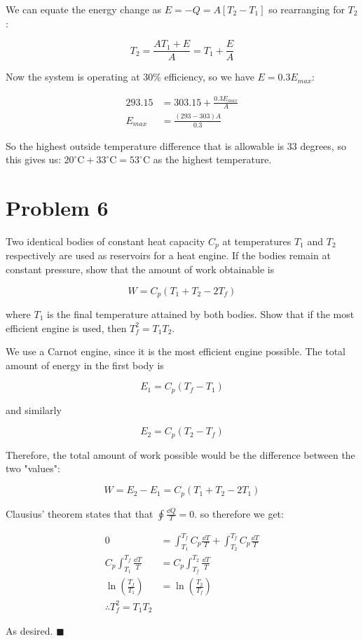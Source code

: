 \documentclass{article}
\begin{document}
\begin{solution}
    We can equate the energy change as $E = -Q = A[T_2 - T_1]$ so rearranging for $T_2$: 
    
    \[ T_2 = \frac{AT_1 + E}{A} = T_1 + \frac{E}{A}\]

    Now the system is operating at 30\% efficiency, so we have $E = 0.3E_{max}$:

    \begin{align*}
     293.15 &= 303.15 + \frac{0.3E_{max}}{A}\\
     E_{max} &= \frac{(293 - 303)A}{0.3}
    \end{align*}

    So the highest outside temperature difference that is allowable is 33 degrees, so this gives us: $20^\circ\text{C} + 33^\circ\text{C} = 53^\circ$C as the highest temperature.
\end{solution}

\pagebreak 

\section*{Problem 6}

Two identical bodies of constant heat capacity $C_p$ at temperatures $T_1$ and $T_2$ respectively are used as reservoirs for a heat engine. If the bodies remain at constant pressure, show that the amount of work obtainable is 

\[ W = C_p(T_1 + T_2 - 2T_f)\] 

where $T_1$ is the final temperature attained by both bodies. Show that if the most efficient engine is used, then $T_f^2 = T_1T_2$.

\begin{solution}
    We use a Carnot engine, since it is the most efficient engine possible. The total amount of energy in the first body is 

    \[ E_1 = C_p (T_f - T_1)\]

    and similarly

    \[ E_2 = C_p(T_2 - T_f)\] 

    Therefore, the total amount of work possible would be the difference between the two "values": 
    
    \[W = E_2 - E_1 = C_p (T_1 + T_2 - 2T_1)\]

    Clausius' theorem states that that $\oint \frac{\dd Q}{T} = 0$. so therefore we get:

    \begin{align*}
        0 &= \int_{T_1}^{T_f} C_p \frac{\dd T}{T} + \int_{T_2}^{T_f} C_p \frac{\dd T}{T}\\
        C_p \int_{T_1}^{T_f} \frac{\dd T}{T} &= C_p\int_{T_f}^{T_2} \frac{\dd T}{T}\\
        \ln\left(\frac{T_f}{T_1}\right) &= \ln\left(\frac{T_2}{T_f}\right)\\
        \therefore T_f^2 = T_1T_2 
    \end{align*}

    As desired. $\blacksquare$
\end{solution}
\end{document}
